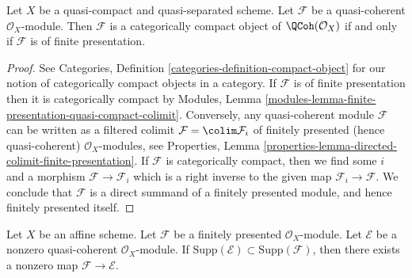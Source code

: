 \begin{lemma}
\label{lemma-categorically-compact-QCoh}
Let $X$ be a quasi-compact and quasi-separated scheme.
Let $\mathcal{F}$ be a quasi-coherent $\mathcal{O}_X$-module.
Then $\mathcal{F}$ is a categorically compact object of
$\QCoh(\mathcal{O}_X)$ if and only if $\mathcal{F}$ is of
finite presentation.
\end{lemma}

\begin{proof}
See Categories, Definition \ref{categories-definition-compact-object}
for our notion of categorically compact objects in a category.
If $\mathcal{F}$ is of finite presentation then it is categorically compact by
Modules, Lemma \ref{modules-lemma-finite-presentation-quasi-compact-colimit}.
Conversely, any quasi-coherent module $\mathcal{F}$ can be written
as a filtered colimit $\mathcal{F} = \colim \mathcal{F}_i$ of
finitely presented (hence quasi-coherent)
$\mathcal{O}_X$-modules, see Properties, Lemma
\ref{properties-lemma-directed-colimit-finite-presentation}.
If $\mathcal{F}$ is categorically compact, then we find
some $i$ and a morphism $\mathcal{F} \to \mathcal{F}_i$
which is a right inverse to the given map $\mathcal{F}_i \to \mathcal{F}$.
We conclude that $\mathcal{F}$ is a direct summand of a
finitely presented module, and hence finitely presented itself.
\end{proof}

\begin{lemma}
\label{lemma-supported-on-support-pre}
Let $X$ be an affine scheme. Let $\mathcal{F}$ be a finitely presented
$\mathcal{O}_X$-module. Let $\mathcal{E}$ be a nonzero quasi-coherent
$\mathcal{O}_X$-module. If
$\text{Supp}(\mathcal{E}) \subset \text{Supp}(\mathcal{F})$,
then there exists a nonzero map $\mathcal{F} \to \mathcal{E}$.
\end{lemma}

